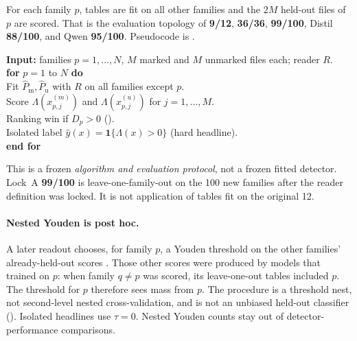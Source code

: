 \documentclass[11pt,a4paper]{article}
\theoremstyle{definition}
\newcommand{\LLR}{\Lambda}
\newcommand{\Phatm}{\hat{P}_{\mathrm{m}}}
\newcommand{\Phatu}{\hat{P}_{\mathrm{u}}}
\begin{document}
For each family $p$, tables are fit on all other families and the $2M$
held-out files of $p$ are scored. That is the evaluation topology of
\textbf{9/12}, \textbf{36/36}, \textbf{99/100}, Distil
\textbf{88/100}, and Qwen \textbf{95/100}. Pseudocode is
.

\begin{algorithm}[t]
\caption{Leave-one-family-out ranking and isolated scores.
Tables for family $p$ never contain $p$'s own files. Consecutive LOFO
models share $N-2$ of $N-1$ training families, so the $N$ wins are
dependent.}
\label{alg:loo}
\small
\textbf{Input:} families $p=1,\ldots,N$, $M$ marked and $M$ unmarked
files each; reader $R$.\\
\textbf{for} $p=1$ to $N$ \textbf{do}\\
\quad Fit $\Phatm,\Phatu$ with $R$ on all families except $p$.\\
\quad Score $\LLR(x_{p,j}^{(m)})$ and $\LLR(x_{p,j}^{(u)})$ for
$j=1,\ldots,M$.\\
\quad Ranking win if $D_p>0$ ().\\
\quad Isolated label $\hat y(x)=\mathbf{1}\{\LLR(x)>0\}$ (hard
headline).\\
\textbf{end for}
\end{algorithm}

This is a frozen \emph{algorithm and evaluation protocol}, not a frozen fitted detector.
Lock~A \textbf{99/100} is leave-one-family-out on the 100 new families after the reader definition was locked.
It is not application of tables fit on the original 12.

\paragraph{Nested Youden is post hoc.}
A later readout chooses, for family $p$, a Youden threshold on the other
families' already-held-out scores \citep{youden1950index}. Those other
scores were produced by models that trained on $p$: when family $q\neq p$
was scored, its leave-one-out tables included $p$. The threshold for $p$
therefore sees mass from $p$. The procedure is a threshold nest, not
second-level nested cross-validation, and is not an unbiased held-out
classifier (). Isolated headlines use $\tau=0$. Nested
Youden counts stay out of detector-performance comparisons.
\end{document}
